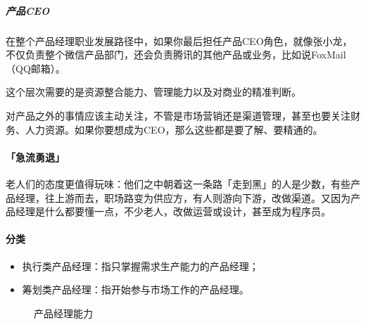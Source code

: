 \documentclass[letterpaper,10pt,english]{sphinxmanual}
\let\sphinxpxdimen\pdfpxdimen\else\newdimen\sphinxpxdimen
\begin{document}
\subparagraph{产品CEO}
\label{\detokenize{chapter_introduction/career_path:ceo}}
在整个产品经理职业发展路径中，如果你最后担任产品CEO角色，就像张小龙，不仅负责整个微信产品部门，还会负责腾讯的其他产品或业务，比如说FoxMail（QQ邮箱）。

这个层次需要的是资源整合能力、管理能力以及对商业的精准判断。

对产品之外的事情应该主动关注，不管是市场营销还是渠道管理，甚至也要关注财务、人力资源。如果你要想成为CEO，那么这些都是要了解、要精通的。
%
\begin{footnote}[359]\sphinxAtStartFootnote
{}
%
\end{footnote}

\begin{center}\end{center} 


\paragraph{「急流勇退」}
\label{\detokenize{chapter_introduction/career_path:id16}}
老人们的态度更值得玩味：他们之中朝着这一条路「走到黑」的人是少数，有些产品经理，往上游而去，职场路变为供应方，有人则游向下游，改做渠道。又因为产品经理是什么都要懂一点，不少老人，改做运营或设计，甚至成为程序员。%
\begin{footnote}[360]\sphinxAtStartFootnote
{}
%
\end{footnote}


\paragraph{分类}
\label{\detokenize{chapter_introduction/career_path:id17}}\begin{itemize}
\item {} 
执行类产品经理：指只掌握需求生产能力的产品经理；

\item {} 
筹划类产品经理：指开始参与市场工作的产品经理。

\end{itemize}

\begin{figure}[H]
\centering
\capstart

\noindent\sphinxincludegraphics[width=400\sphinxpxdimen]{{PM_class}.png}
\caption{产品经理能力\sphinxfootnotemark[361]}\label{\detokenize{chapter_introduction/career_path:id31}}\end{figure}
%
\begin{footnotetext}[361]\sphinxAtStartFootnote
{}
%
\end{footnotetext}\ignorespaces 
{}
\end{document}
